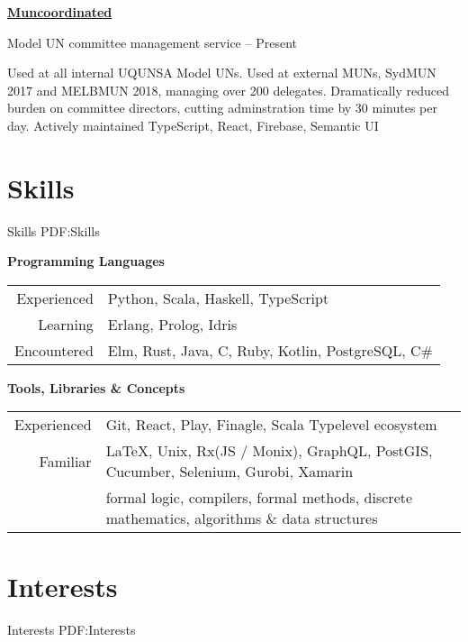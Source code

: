 \documentclass[a4paper,10pt,oneside]{article}
\begin{document}
\begin{body}
\EntryGap

\href{https://github.com/MaxwellBo/Muncoordinated-2}{\textbf{Muncoordinated}}
\par Model UN committee management service\hfill {} -- Present
\begin{detail}
	\BulletItem Used at all internal UQUNSA Model UNs. Used at external MUNs, SydMUN 2017 and MELBMUN 2018, managing over 200 delegates. Dramatically reduced burden on committee directors, cutting adminstration time by 30 minutes per day. Actively maintained
	\BulletItem TypeScript, React, Firebase, Semantic UI
\end{detail}


\section
{Skills}
{Skills}
{PDF:Skills}

\textbf{Programming Languages}
\par
\begin{tabular}{rl}
\par Experienced & Python, Scala, Haskell, TypeScript\\
\par Learning & Erlang, Prolog, Idris\\
\par Encountered & Elm, Rust, Java, C, Ruby, Kotlin, PostgreSQL, C\#
\end{tabular}

\EntryGap
\EntryGap
\EntryGap

\textbf{Tools, Libraries \& Concepts}

\par
\begin{tabular}{rl}
\par Experienced & Git, React, Play, Finagle, Scala Typelevel ecosystem\\
\par Familiar & \LaTeX, Unix, Rx(JS / Monix), GraphQL, PostGIS, Cucumber, Selenium, Gurobi, Xamarin\\
& formal logic, compilers, formal methods, discrete mathematics, algorithms \& data structures\\
\end{tabular}

\section
{Interests}
{Interests}
{PDF:Interests}


\end{body}
\end{document}
